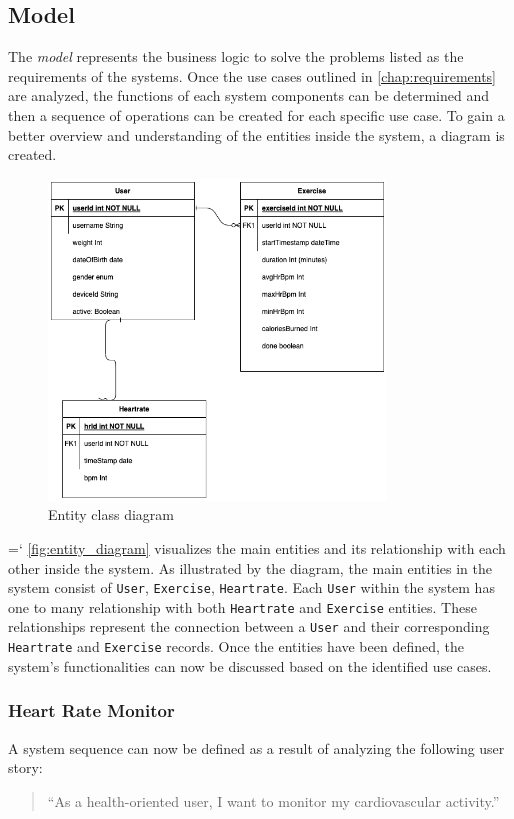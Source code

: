 \subsection{Model}
\label{chap:model_design}
The \emph{model} represents the business logic to solve the problems listed as the requirements of the systems. Once the use cases outlined in \autoref{chap:requirements} are analyzed, the functions of each system components can be determined and then a sequence of operations can be created for each specific use case.
To gain a better overview and understanding of the entities inside the system, a diagram is created.
\begin{figure}[H]
    \centering
    \includegraphics[width=0.8\textwidth]{diagrams/ham-entity.drawio.png}
    \caption{Entity class diagram}
    \label{fig:entity_diagram}
\end{figure}
{{\ttfamily \hyphenchar\the\font=`\-}
\autoref{fig:entity_diagram} visualizes the main entities and its relationship with each other inside the system. As illustrated by the diagram, the main entities in the system consist of \texttt{User}, \texttt{Exercise}, \texttt{Heartrate}. 
Each \texttt{User} within the system has one to many relationship with both \texttt{Heartrate} and \texttt{Exercise} entities. These relationships represent the connection between a \texttt{User} and their corresponding \texttt{Heartrate} and \texttt{Exercise} records. 
Once the entities have been defined, the system's functionalities can now be discussed based on the identified use cases.
\par}


\subsubsection{Heart Rate Monitor}
\label{chap:hr_monitor_design}
A system sequence can now be defined as a result of analyzing the following user story:
\begin{quotation}
    \enquote{As a health-oriented user, I want to monitor my cardiovascular activity.} 
\end{quotation}

